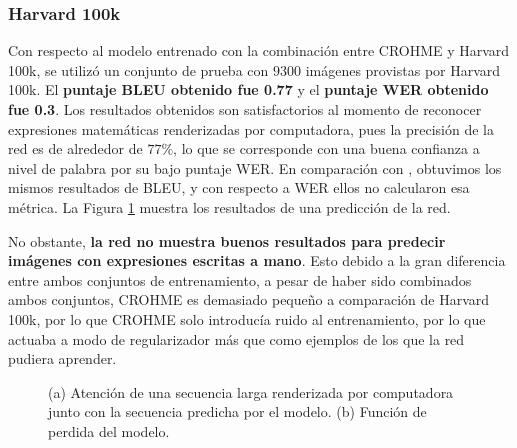 \subsubsection{Harvard 100k}

Con respecto al modelo entrenado con la combinación entre CROHME y Harvard 100k, se utilizó un conjunto de prueba con $9300$ imágenes provistas por Harvard 100k. El \textbf{puntaje BLEU obtenido fue 0.77} y el \textbf{puntaje WER obtenido fue 0.3}. Los resultados obtenidos son satisfactorios al momento de reconocer expresiones matemáticas renderizadas por computadora, pues la precisión de la red es de alrededor de $77\%$, lo que se corresponde con una buena confianza a nivel de palabra por su bajo puntaje WER. En comparación con \cite{harvard}, obtuvimos los mismos resultados de BLEU, y con respecto a WER ellos no calcularon esa métrica. La Figura \ref{fig:modelo-harvard-attention}  muestra los resultados de una predicción de la red. 

No obstante, \textbf{la red no muestra buenos resultados para predecir imágenes con expresiones escritas a mano}. Esto  debido a la gran diferencia entre ambos conjuntos de entrenamiento, a pesar de haber sido combinados ambos conjuntos, CROHME es demasiado pequeño a comparación de Harvard 100k, por lo que CROHME solo introducía ruido al entrenamiento, por lo que actuaba a modo de regularizador más que como ejemplos de los que la red pudiera aprender. 

\begin{figure}[H]
    \centering
    \caption{(a) Atención de una secuencia larga renderizada por computadora junto con la secuencia predicha por el modelo. (b) Función de perdida del modelo.}
    \label{fig:modelo-harvard-attention}
\end{figure}


